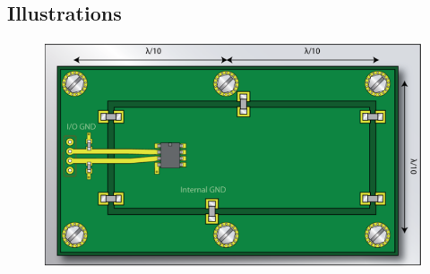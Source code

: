 \documentclass[resume]{subfiles}
\begin{document}
\begin{multicols}{3}
\subsection{Illustrations}
\begin{figure}[H]
\centering
\includegraphics[width=0.9\columnwidth]{img_30.png}
\end{figure}
\end{multicols}
\end{document}
